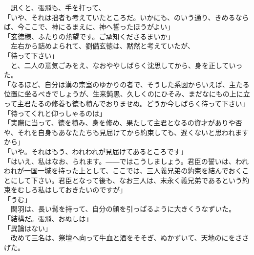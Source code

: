 \documentclass[
  paper=a5,
  fontsize=10pt,
  jafontsize=9.5pt,
  tate,                  %
  open_bracket_pos=nibu, %
]{jlreq}
\begin{document}
　訊くと、張飛も、手を打って、\\


「いや、それは拙者も考えていたところだ。いかにも、のいう通り、きめるならば、今ここで、神にるまえに、神へ誓ったほうがよい」\\


「玄徳様、ふたりの熱望です。ご承知くださるまいか」\\


　左右から詰めよられて、劉備玄徳は、黙然と考えていたが、\\


「待って下さい」\\


　と、二人の意気ごみをえ、なおややしばらく沈思してから、身を正していった。\\


「なるほど、自分は漢の宗室のゆかりの者で、そうした系図からいえば、主たる位置に坐るべきでしょうが、生来鈍愚、久しくのにひそみ、まだなにもの上に立って主君たるの修養も徳も積んでおりませぬ。どうか今しばらく待って下さい」\\


「待ってくれと仰っしゃるのは」\\


「実際に当って、徳を積み、身を修め、果たして主君となるの資才がありや否や、それを自身もあなたたちも見届けてから約束しても、遅くないと思われますから」\\


「いや。それはもう、われわれが見届けてあるところです」\\


「はいえ、私はなお、られます。――ではこうしましょう。君臣の誓いは、われわれが一国一城を持った上として、ここでは、三人義兄弟の約束を結んでおくことにして下さい。君臣となって後も、なお三人は、末永く義兄弟であるという約束をむしろ私はしておきたいのですが」\\


「うむ」\\


　関羽は、長い髯を持って、自分の顔を引っぱるように大きくうなずいた。\\


「結構だ。張飛、おぬしは」\\


「異論はない」\\


　改めて三名は、祭壇へ向って牛血と酒をそそぎ、ぬかずいて、天地のにをささげた。\\
\end{document}
